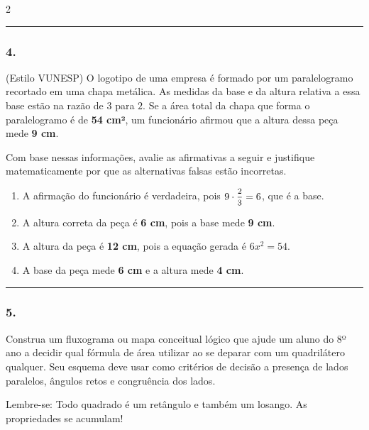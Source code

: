 \documentclass[twoside, 10pt, a4paper]{article}
\newlength{\espacoPreQuestao}\setlength{\espacoPreQuestao}{0.1cm}
\newlength{\espacoQuestao}\setlength{\espacoQuestao}{0.2cm}
\newlength{\espacoAlt}\setlength{\espacoAlt}{0.2cm}
\begin{document}
\begin{multicols*}{2}
\noindent\textcolor{CorLinha}{\rule{\linewidth}{0.5pt}} 
\par\vspace{\espacoPreQuestao}
\subsubsection*{4.} (Estilo VUNESP) O logotipo de uma empresa é formado por um paralelogramo recortado em uma chapa metálica. As medidas da base e da altura relativa a essa base estão na razão de $ 3 $ para $ 2 $. Se a área total da chapa que forma o paralelogramo é de \textbf{54 cm²}, um funcionário afirmou que a altura dessa peça mede \textbf{9 cm}. 

Com base nessas informações, avalie as afirmativas a seguir e justifique matematicamente por que as alternativas falsas estão incorretas.

\begin{enumerate}[label=\alph*), itemsep=\espacoAlt]
\item A afirmação do funcionário é verdadeira, pois $ 9 \cdot \mfrac{2}{3} = 6 $, que é a base.
\item A altura correta da peça é \textbf{6 cm}, pois a base mede \textbf{9 cm}.
\item A altura da peça é \textbf{12 cm}, pois a equação gerada é $ 6x^2 = 54 $.
\item A base da peça mede \textbf{6 cm} e a altura mede \textbf{4 cm}.
\end{enumerate}
\par\vspace{\espacoQuestao}

\noindent\textcolor{CorLinha}{\rule{\linewidth}{0.5pt}} 
\par\vspace{\espacoPreQuestao}
\subsubsection*{5.} Construa um fluxograma ou mapa conceitual lógico que ajude um aluno do 8º ano a decidir qual fórmula de área utilizar ao se deparar com um quadrilátero qualquer. Seu esquema deve usar como critérios de decisão a presença de lados paralelos, ângulos retos e congruência dos lados.
\par\vspace{\espacoQuestao}

\begin{boxdica}
Lembre-se: Todo quadrado é um retângulo e também um losango. As propriedades se acumulam!
\end{boxdica}


\end{multicols*}
\end{document}
